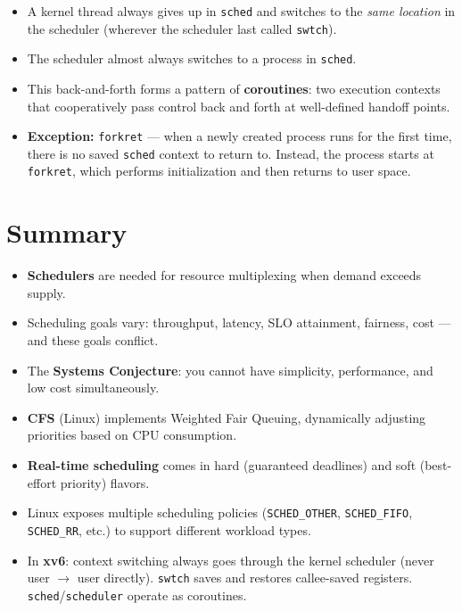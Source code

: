 \documentclass[11pt]{article}
\begin{document}
\begin{itemize}
    \item A kernel thread always gives up in \texttt{sched} and switches to the \emph{same location} in the scheduler (wherever the scheduler last called \texttt{swtch}).
    \item The scheduler almost always switches to a process in \texttt{sched}.
    \item This back-and-forth forms a pattern of \textbf{coroutines}: two execution contexts that cooperatively pass control back and forth at well-defined handoff points.
    \item \textbf{Exception:} \texttt{forkret} --- when a newly created process runs for the first time, there is no saved \texttt{sched} context to return to. Instead, the process starts at \texttt{forkret}, which performs initialization and then returns to user space.
\end{itemize}

\section{Summary}

\begin{itemize}
    \item \textbf{Schedulers} are needed for resource multiplexing when demand exceeds supply.
    \item Scheduling goals vary: throughput, latency, SLO attainment, fairness, cost --- and these goals conflict.
    \item The \textbf{Systems Conjecture}: you cannot have simplicity, performance, and low cost simultaneously.
    \item \textbf{CFS} (Linux) implements Weighted Fair Queuing, dynamically adjusting priorities based on CPU consumption.
    \item \textbf{Real-time scheduling} comes in hard (guaranteed deadlines) and soft (best-effort priority) flavors.
    \item Linux exposes multiple scheduling policies (\texttt{SCHED\_OTHER}, \texttt{SCHED\_FIFO}, \texttt{SCHED\_RR}, etc.) to support different workload types.
    \item In \textbf{xv6}: context switching always goes through the kernel scheduler (never user $\to$ user directly). \texttt{swtch} saves and restores callee-saved registers. \texttt{sched}/\texttt{scheduler} operate as coroutines.
\end{itemize}
\end{document}
